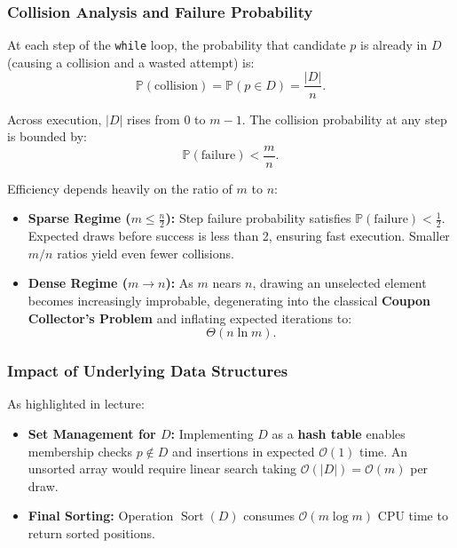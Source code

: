 \subsubsection{Collision Analysis and Failure Probability}
At each step of the \texttt{while} loop, the probability that candidate $p$ is already in $D$ (causing a collision and a wasted attempt) is:
\begin{equation}
  \mathbb{P}(\text{collision}) = \mathbb{P}(p \in D) = \frac{|D|}{n}.
\end{equation}

Across execution, $|D|$ rises from $0$ to $m - 1$. The collision probability at any step is bounded by:
\begin{equation}
  \mathbb{P}(\text{failure}) < \frac{m}{n}.
\end{equation}

\begin{property}
Efficiency depends heavily on the ratio of $m$ to $n$:
\begin{itemize}
  \item \textbf{Sparse Regime ($m \le \frac{n}{2}$):} Step failure probability satisfies $\mathbb{P}(\text{failure}) < \frac{1}{2}$. Expected draws before success is less than 2, ensuring fast execution. Smaller $m/n$ ratios yield even fewer collisions.
  \item \textbf{Dense Regime ($m \to n$):} As $m$ nears $n$, drawing an unselected element becomes increasingly improbable, degenerating into the classical \textbf{Coupon Collector's Problem} and inflating expected iterations to:
  \begin{equation}
    \Theta(n \ln m).
  \end{equation}
\end{itemize}
\end{property}

\subsubsection{Impact of Underlying Data Structures}
As highlighted in lecture:
\begin{itemize}
  \item \textbf{Set Management for $D$:} Implementing $D$ as a \textbf{hash table} enables membership checks $p \notin D$ and insertions in expected $\mathcal{O}(1)$ time. An unsorted array would require linear search taking $\mathcal{O}(|D|) = \mathcal{O}(m)$ per draw.
  \item \textbf{Final Sorting:} Operation $\operatorname{Sort}(D)$ consumes $\mathcal{O}(m \log m)$ CPU time to return sorted positions.
\end{itemize}

